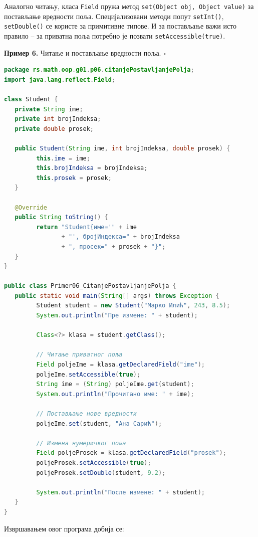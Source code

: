 Аналогно читању, класа \texttt{Field} пружа метод \texttt{set(Object obj, Object value)} за постављање вредности поља. Специјализовани методи попут \texttt{setInt()}, \texttt{setDouble()} се користе за примитивне типове. И за постављање важи исто правило – за приватна поља потребно је позвати \texttt{setAccessible(true)}.


\bigskip

\noindent \textbf{Пример 6.} Читање и постављање вредности поља. $\square$

\medskip

\begin{lstlisting}[language=Java]
package rs.math.oop.g01.p06.citanjePostavljanjePolja;
import java.lang.reflect.Field;
 
class Student {
   private String ime;
   private int brojIndeksa;
   private double prosek;
 
   public Student(String ime, int brojIndeksa, double prosek) {
         this.ime = ime;
         this.brojIndeksa = brojIndeksa;
         this.prosek = prosek;
   }
 
   @Override
   public String toString() {
         return "Student{име='" + ime
                + "', бројИндекса=" + brojIndeksa
                + ", просек=" + prosek + "}";
   }
}
 
public class Primer06_CitanjePostavljanjePolja {
   public static void main(String[] args) throws Exception {
         Student student = new Student("Марко Илић", 243, 8.5);
         System.out.println("Пре измене: " + student);
 
         Class<?> klasa = student.getClass();
 
         // Читање приватног поља
         Field poljeIme = klasa.getDeclaredField("ime");
         poljeIme.setAccessible(true);
         String ime = (String) poljeIme.get(student);
         System.out.println("Прочитано име: " + ime);
 
         // Постављање нове вредности
         poljeIme.set(student, "Ана Сарић");
 
         // Измена нумеричког поља
         Field poljeProsek = klasa.getDeclaredField("prosek");
         poljeProsek.setAccessible(true);
         poljeProsek.setDouble(student, 9.2);
 
         System.out.println("После измене: " + student);
   }
}
\end{lstlisting}


Извршавањем овог програма добија се:

